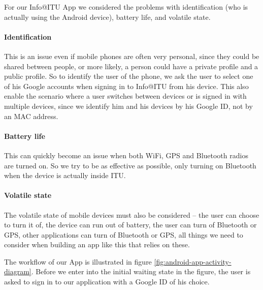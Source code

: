 \documentclass{ubicomp2011}
\begin{document}
For our Info@ITU App we considered the problems with identification (who is actually using the Android device), battery life, and volatile state.

\paragraph{Identification}
This is an issue even if mobile phones are often very personal, since they could be shared between people, or more likely, a person could have a private profile and a public profile. So to identify the user of the phone, we ask the user to select one of his Google accounts when signing in to Info@ITU from his device. This also enable the scenario where a user switches between devices or is signed in with multiple devices, since we identify him and his devices by his Google ID, not by an MAC address.

\paragraph{Battery life}
This can quickly become an issue when both WiFi, GPS and Bluetooth radios are turned on. So we try to be as effective as possible, only turning on Bluetooth when the device is actually inside ITU.

\paragraph{Volatile state}
The volatile state of mobile devices must also be considered -- the user can choose to turn it of, the device can run out of battery, the user can turn of Bluetooth or GPS, other applications can turn of Bluetooth or GPS, all things we need to consider when building an app like this that relies on these.

The workflow of our App is illustrated in figure \ref{fig:android-app-activity-diagram}. Before we enter into the initial waiting state in the figure, the user is asked  to sign in to our application with a Google ID of his choice.
\end{document}
